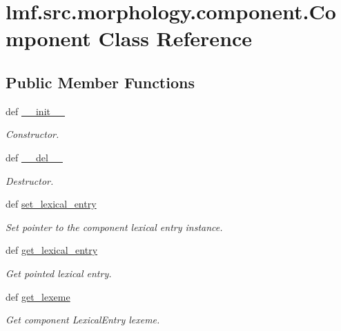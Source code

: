 \hypertarget{classlmf_1_1src_1_1morphology_1_1component_1_1_component}{\section{lmf.\+src.\+morphology.\+component.\+Component Class Reference}
\label{classlmf_1_1src_1_1morphology_1_1component_1_1_component}
}
\subsection*{Public Member Functions}
\begin{DoxyCompactItemize}
\item 
def \hyperlink{classlmf_1_1src_1_1morphology_1_1component_1_1_component_ae5d54b8fa8350b799ebbf914ef528dd7}{\+\_\+\+\_\+init\+\_\+\+\_\+}
\begin{DoxyCompactList}\small\item\em Constructor. \end{DoxyCompactList}\item 
def \hyperlink{classlmf_1_1src_1_1morphology_1_1component_1_1_component_aa9c51c8d6a9f03f3e36f8b417a8f2f1e}{\+\_\+\+\_\+del\+\_\+\+\_\+}
\begin{DoxyCompactList}\small\item\em Destructor. \end{DoxyCompactList}\item 
def \hyperlink{classlmf_1_1src_1_1morphology_1_1component_1_1_component_a4ab10116f9391089519fea00d6abdb6b}{set\+\_\+lexical\+\_\+entry}
\begin{DoxyCompactList}\small\item\em Set pointer to the component lexical entry instance. \end{DoxyCompactList}\item 
def \hyperlink{classlmf_1_1src_1_1morphology_1_1component_1_1_component_adbe6d9c8fc9cdbf9dd0a6b5c07a3afd7}{get\+\_\+lexical\+\_\+entry}
\begin{DoxyCompactList}\small\item\em Get pointed lexical entry. \end{DoxyCompactList}\item 
def \hyperlink{classlmf_1_1src_1_1morphology_1_1component_1_1_component_a78402da2b76d5031e94e90943c1cd68e}{get\+\_\+lexeme}
\begin{DoxyCompactList}\small\item\em Get component Lexical\+Entry lexeme. \end{DoxyCompactList}\end{DoxyCompactItemize}
